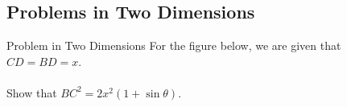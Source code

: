 \subsection{Problems in Two Dimensions}
\begin{wex}{Problem in Two Dimensions}
{For the figure below, we are given that $CD=BD=x$. \\ \\
Show that $BC^2=2x^2(1+\sin\theta)$.\\

}
\end{wex}
